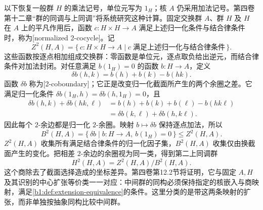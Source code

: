 \ProseParagraphBreak
以下恢复一般群 \(H\) 的乘法记号，单位元写为 \(1_H\)；核 \(A\) 仍采用加法记号。第四卷第十二章“群的同调与上同调”将系统研究这种计算。固定交换群 \(A\)、群 \(H\) 及 \(H\) 在 \(A\) 上的平凡作用后，函数 \(c:H\times H\rightarrow A\) 满足上述归一化条件与结合律条件时，称为[normalized 2-cocycle]。记
\[
	Z^2(H,A)=\{\,c:H\times H\rightarrow A\mid c\;\text{满足上述归一化与结合律条件}\,\}.
\]
这些函数按逐点相加组成交换群：零函数是单位元，逐点取负给出逆元，而结合律条件对加法封闭。对任意满足 \(b(1_H)=0\) 的函数 \(b:H\rightarrow A\)，定义
\[
	\delta b(h,k)=b(h)+b(k)-b(hk).
\]
函数 \(\delta b\) 称为[2-coboundary]；它正是改变归一化截面所产生的两个余圈之差。它满足归一化条件 \(\delta b(1_H,h)=\delta b(h,1_H)=0\)，且
\[
	\begin{aligned}
		\delta b(h,k)+\delta b(hk,\ell) &=b(h)+b(k)+b(\ell)-b(hk\ell)\\
		&=\delta b(k,\ell)+\delta b(h,k\ell).
	\end{aligned}
\]
因此每个 \(2\)-余边都是归一化 \(2\)-余圈。映射 \(b\mapsto\delta b\) 保持逐点加法，所以
\[
	B^2(H,A)=\{\,\delta b\mid b:H\rightarrow A,\ b(1_H)=0\,\} \leq Z^2(H,A).
\]
\(Z^2(H,A)\) 收集所有满足结合律条件的归一化因子集，\(B^2(H,A)\) 收集仅由换截面产生的变化。把相差 \(2\)-余边的余圈视为同一类，得到第二上同调群
\[
	H^2(H,A)=Z^2(H,A)/B^2(H,A).
\]
这个商除去了截面选择造成的坐标差异。第四卷第12.2节将证明，它与固定 \(A,H\) 及其识别的中心扩张等价类一一对应：中间群的同构必须保持指定的核嵌入与商映射，满足\cref{b1:def:extension-equivalence}的条件。这里分类的是带这两条映射的扩张，而非单独按抽象同构比较中间群。
